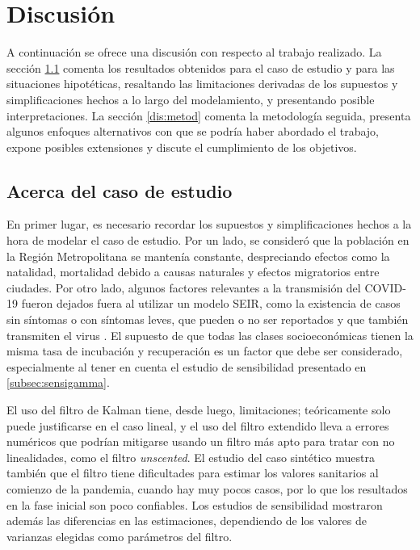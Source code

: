 \chapter{Discusión} \label{chap:discus}

A continuación se ofrece una discusión con respecto al trabajo realizado. La sección \ref{dis:caso} comenta los resultados obtenidos para el caso de estudio y para las situaciones hipotéticas, resaltando las limitaciones derivadas de los supuestos y simplificaciones hechos a lo largo del modelamiento, y presentando posible interpretaciones. La sección \ref{dis:metod} comenta la metodología seguida, presenta algunos enfoques alternativos con que se podría haber abordado el trabajo, expone posibles extensiones y discute el cumplimiento de los objetivos.

\section{Acerca del caso de estudio}\label{dis:caso}

En primer lugar, es necesario recordar los supuestos y simplificaciones hechos a la hora de modelar el caso de estudio. Por un lado, se consideró que la población en la Región Metropolitana se mantenía constante, despreciando efectos como la natalidad, mortalidad debido a causas naturales y efectos migratorios entre ciudades. Por otro lado, algunos factores relevantes a la transmisión del COVID-19 fueron dejados fuera al utilizar un modelo SEIR, como la existencia de casos sin síntomas o con síntomas leves, que pueden o no ser reportados y que también transmiten el virus \cite{Li2020c}\cite{Byambasuren2020}\cite{Gao2021}. El supuesto de que todas las clases socioeconómicas tienen la misma tasa de incubación y recuperación es un factor que debe ser considerado, especialmente al tener en cuenta el estudio de sensibilidad presentado en \ref{subsec:sensigamma}.


El uso del filtro de Kalman tiene, desde luego, limitaciones; teóricamente solo puede justificarse en el caso lineal, y el uso del filtro extendido lleva a errores numéricos que podrían mitigarse usando un filtro más apto para tratar con no linealidades, como el filtro \textit{unscented}. El estudio del caso sintético muestra también que el filtro tiene dificultades para estimar los valores sanitarios al comienzo de la pandemia, cuando hay muy pocos casos, por lo que los resultados en la fase inicial son poco confiables. Los estudios de sensibilidad mostraron además las diferencias en las estimaciones, dependiendo de los valores de varianzas elegidas como parámetros del filtro.

